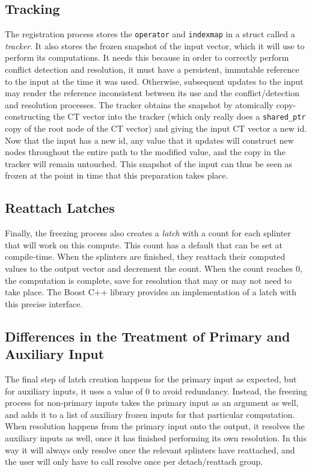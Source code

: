 \subsection{Tracking}
The registration process stores the \texttt{operator} and \texttt{indexmap} in a
struct called a \textit{tracker}. It also stores the frozen snapshot of the
input vector, which it will use to perform its computations. It needs this
because in order to correctly perform conflict detection and resolution, it must
have a persistent, immutable reference to the input at the time it was used.
Otherwise, subsequent updates to the input may render the reference inconsistent
between its use and the conflict/detection and resolution processes. The tracker
obtains the snapshot by atomically copy-constructing the CT vector into the
tracker (which only really does a \texttt{shared\_ptr} copy of the root node of
the CT vector) and giving the input CT vector a new id. Now that the input has a
new id, any value that it updates will construct new nodes throughout the entire
path to the modified value, and the copy in the tracker will remain untouched.
This snapshot of the input can thus be seen as frozen at the point in time that
this preparation takes place.

\subsection{Reattach Latches}
Finally, the freezing process also creates a \textit{latch} with a count for each
splinter that will work on this compute. This count has a default that can be
set at compile-time. When the splinters are finished, they reattach their
computed values to the output vector and decrement the count. When the count
reaches 0, the computation is complete, save for resolution that may or may not
need to take place. The Boost C++ library provides an implementation of a latch with 
this precise interface.

\subsection{Differences in the Treatment of Primary and Auxiliary Input}
The final step of latch creation happens for the primary input as expected, but for 
auxiliary inputs, it uses a value of 0 to avoid redundancy. 
Instead, the freezing process for non-primary inputs takes the primary input as an 
argument as well, and adds it to a list of auxiliary frozen inputs for that particular
computation. When resolution happens from the primary input onto the output, it resolves 
the auxiliary inputs as well, once it has finished performing its own resolution. In 
this way it will always only resolve once the relevant splinters have reattached, and 
the user will only have to call resolve once per detach/reattach group.

